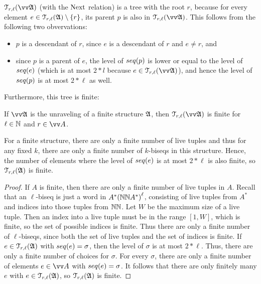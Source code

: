 \noindent
$\mathcal{T}_{r,\ell}(\unravel{A})$ (with the $\mathrm{Next}$ relation) is a tree with the root $r$, because for every element $e \in \mathcal{T}_{r,\ell}({\mathfrak{A}}) \setminus \{r\}$, its parent $p$ is also in $\mathcal{T}_{r,\ell}(\unravel{A})$.
This follows from the following two obvervations:
\begin{itemize}
  \item $p$ is a descendant of $r$, since $e$ is a descendant of $r$ and $e \neq r$, and
  \item since $p$ is a parent of $e$, the level of $\seq{p}$ is lower or equal to the level of $\seq{e}$ (which is at most $2 * l$ because $e \in \mathcal{T}_{r,\ell}(\unravel{A})$), and hence the level of $\seq{p}$ is at most $2 * \ell$ as well.
\end{itemize}
Furthermore, this tree is finite:
\begin{lemma}\label{lem:bounded-trees-are-finite}
  If $\unravel{A}$ is the unraveling of a finite structure ${\mathfrak{A}}$, then $\mathcal{T}_{r,\ell}(\unravel{A})$ is finite for $\ell \in {\mathbb{N}}$ and $r \in \unraveldom{A}$.
\end{lemma}
\begin{proofsketch}
  For a finite structure, there are only a finite number of live tuples and thus for any fixed $k$, there are only a finite number of $k$-biseqs in this structure.
  Hence, the number of elements where the level of $\seq{e}$ is at most $2 * \ell$ is also finite, so $\mathcal{T}_{r,\ell}({\mathfrak{A}})$ is finite.
\end{proofsketch}
\begin{proof}
If $A$ is finite, then there are only a finite number of live tuples in $A$.
Recall that an $\ell$-biseq is just a word in $A^*{({\mathbb{N}}{\mathbb{N}}{}A^{*})}^{\ell}$, consisting of live tuples from $A^{*}$ and indices into those tuples from ${\mathbb{N}}{\mathbb{N}}$.
Let $W$ be the maximum size of a live tuple.
Then an index into a live tuple must be in the range $[1,W]$, which is finite, so the set of possible indices is finite.
Thus there are only a finite number of $\ell$-biseqs, since both the set of live tuples and the set of indices is finite.
If $e \in \mathcal{T}_{r,\ell}({\mathfrak{A}})$ with $\seq{e} = \sigma$, then the level of $\sigma$ is at most $2 * \ell$.
Thus, there are only a finite number of choices for $\sigma$.
For every $\sigma$, there are only a finite number of elements $e \in \unraveldom{A}$ with $\seq{e} = \sigma$.
It follows that there are only finitely many $e$ with $e \in \mathcal{T}_{r,\ell}({\mathfrak{A}})$, so $\mathcal{T}_{r,\ell}({\mathfrak{A}})$ is finite.
\end{proof}
